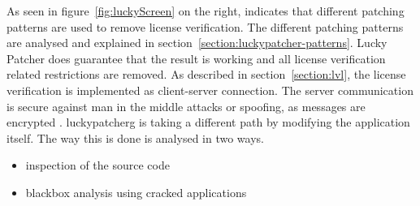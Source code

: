 As seen in figure~\ref{fig:luckyScreen} on the right, indicates that different patching patterns are used to remove license verification.
The different patching patterns are analysed and explained in section~\ref{section:luckypatcher-patterns}.
Lucky Patcher does guarantee that the result is working and all license verification related restrictions are removed.
\newline
As described in section~\ref{section:lvl}, the license verification is implemented as client-server connection.
The server communication is secure against man in the middle attacks or spoofing, as messages are encrypted \cite{munteanLicense}.
\gls{luckypatcherg} is taking a different path by modifying the application itself.
The way this is done is analysed in two ways.
\begin{itemize}
\item inspection of the source code
\item blackbox analysis using cracked applications
\end{itemize}
